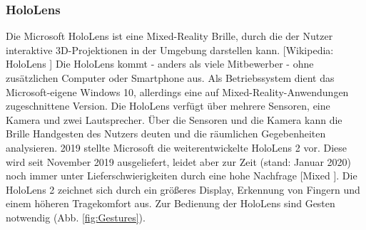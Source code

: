 \documentclass[11pt, titlepage, fleqn]{report}
\begin{document}
                \subsubsection{HoloLens}
                    Die Microsoft HoloLens ist eine Mixed-Reality Brille, durch die der Nutzer interaktive 3D-Projektionen in der Umgebung darstellen kann.
                    [Wikipedia: HoloLens \cite{HoloLens}]\newline
                    Die HoloLens kommt - anders als viele Mitbewerber - ohne zusätzlichen Computer oder Smartphone aus.
                    Als Betriebssystem dient das Microsoft-eigene Windows 10, allerdings eine auf Mixed-Reality-Anwendungen zugeschnittene Version.
                    Die HoloLens verfügt über mehrere Sensoren, eine Kamera und zwei Lautsprecher.
                    Über die Sensoren und die Kamera kann die Brille Handgesten 
                    des Nutzers deuten und die räumlichen Gegebenheiten 
                    analysieren.
                    2019 stellte Microsoft die weiterentwickelte HoloLens 2 vor. Diese wird seit November 2019 ausgeliefert, leidet aber zur Zeit 
                    (stand: Januar 2020) noch immer unter Lieferschwierigkeiten 
                    durch eine hohe Nachfrage [Mixed \cite{Mixed}]. Die 
                    HoloLens 2 zeichnet sich durch 
                    ein größeres Display, Erkennung von Fingern und einem höheren Tragekomfort aus.
                    Zur Bedienung der HoloLens sind Gesten notwendig (Abb. 
                    \ref{fig:Gestures}).
\end{document}
